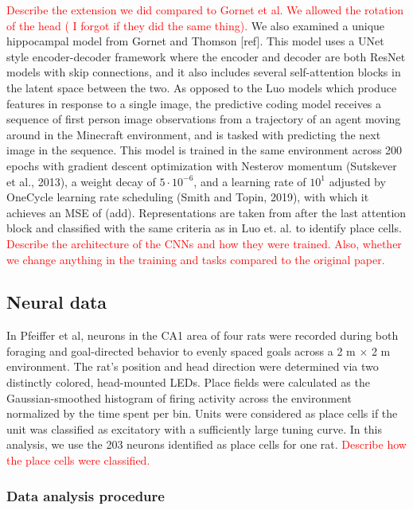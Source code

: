 \documentclass[11pt]{article}
\begin{document}
\textcolor{red}{Describe the extension we did compared to Gornet et al. We allowed the rotation of the head ( I forgot if they did the same thing). }
We also examined a unique hippocampal model from Gornet and Thomson [ref]. This model uses a UNet style encoder-decoder framework where the encoder and decoder are both ResNet models with skip connections, and it also includes several self-attention blocks in the latent space between the two. As opposed to the Luo models which produce features in response to a single image, the predictive coding model receives a sequence of first person image observations from a trajectory of an agent moving around in the Minecraft environment, and is tasked with predicting the next image in the sequence. This model is trained in the same environment across 200 epochs with gradient descent optimization with Nesterov momentum (Sutskever et al., 2013), a weight decay of $5 \cdot 10^{-6}$, and a learning rate of $10^1$ adjusted by OneCycle learning rate scheduling (Smith and Topin, 2019), with which it achieves an MSE of (add). Representations are taken from after the last attention block and classified with the same criteria as in Luo et. al. to identify place cells. \textcolor{red}{Describe the architecture of the CNNs and how they were trained. Also, whether we change anything in the training and tasks compared to the original paper. }

\subsection{Neural data}

In Pfeiffer et al, neurons in the CA1 area of four rats were recorded during both foraging and goal-directed behavior to evenly spaced goals across a 2 m $\times$ 2 m environment. The rat’s position and head direction were determined via two distinctly colored, head-mounted LEDs. Place fields were calculated as the Gaussian-smoothed histogram of firing activity across the environment normalized by the time spent per bin. Units were considered as place cells if the unit was classified as excitatory with a sufficiently large tuning curve. In this analysis, we use the 203 neurons identified as place cells for one rat. \textcolor{red}{Describe how the place cells were classified.}

\subsubsection*{Data analysis procedure} 
\end{document}
